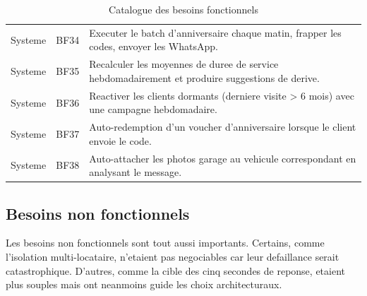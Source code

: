 \begin{table}[H]
\begin{tabular}{p{2.4cm}p{1.2cm}p{9.8cm}}
    Systeme & BF34 & Executer le batch d'anniversaire chaque matin, frapper les codes, envoyer les WhatsApp. \\
    Systeme & BF35 & Recalculer les moyennes de duree de service hebdomadairement et produire suggestions de derive. \\
    Systeme & BF36 & Reactiver les clients dormants (derniere visite > 6 mois) avec une campagne hebdomadaire. \\
    Systeme & BF37 & Auto-redemption d'un voucher d'anniversaire lorsque le client envoie le code. \\
    Systeme & BF38 & Auto-attacher les photos garage au vehicule correspondant en analysant le message. \\
    \bottomrule
  \end{tabular}
  \caption{Catalogue des besoins fonctionnels}
  \label{tab:fr}
\end{table}

\subsection{Besoins non fonctionnels}
Les besoins non fonctionnels sont tout aussi importants. Certains, comme
l'isolation multi-locataire, n'etaient pas negociables car leur defaillance
serait catastrophique. D'autres, comme la cible des cinq secondes de
reponse, etaient plus souples mais ont neanmoins guide les choix
architecturaux.

